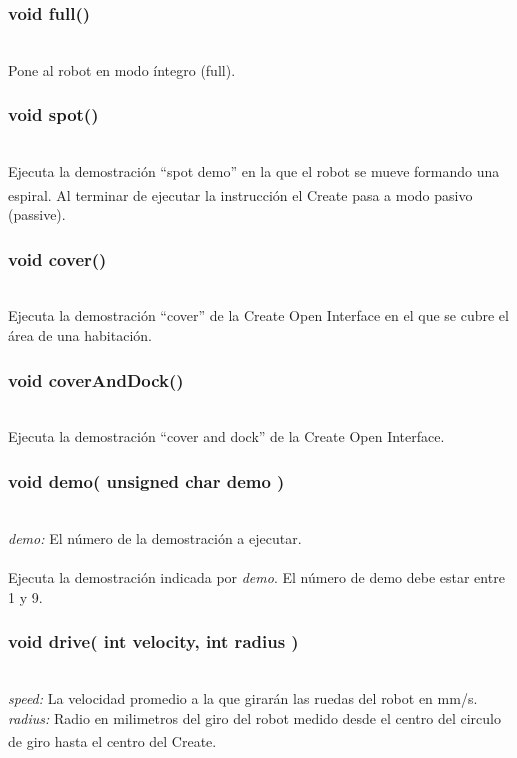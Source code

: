 \documentclass[letterpaper]{book}
\begin{document}
\subsubsection{void full()}\mbox{}\\
Pone al robot en modo íntegro (full).\\

\subsubsection{void spot()}\mbox{}\\
Ejecuta la demostración ``spot demo'' en la que el robot se mueve formando una espiral. Al terminar de ejecutar la instrucción el Create\textsuperscript{\textregistered} pasa a modo pasivo (passive).\\

\subsubsection{void cover()}\mbox{}\\
Ejecuta la demostración ``cover'' de la Create Open Interface en el que se cubre el área de una habitación.\\

\subsubsection{void coverAndDock()}\mbox{}\\
Ejecuta la demostración ``cover and dock'' de la Create Open Interface.

\subsubsection{void demo( unsigned char demo )}\mbox{}\\
\emph{demo: } El número de la demostración a ejecutar.\\\\
Ejecuta la demostración indicada por \emph{demo}. El número de demo debe estar entre 1 y 9.\\
\subsubsection{void drive( int velocity, int radius )}\mbox{}\\
\emph{speed: } La velocidad promedio a la que girarán las ruedas del robot en mm/s.\\
\emph{radius: }Radio en milimetros del giro del robot medido desde el centro del circulo de giro hasta el centro del Create\textsuperscript{\textregistered}.\\\\
\end{document}
